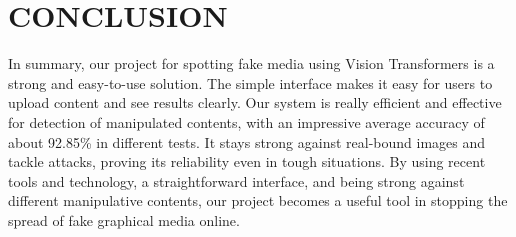 \section{CONCLUSION}
 In summary, our project for spotting fake media using Vision Transformers is a strong and easy-to-use solution. The simple interface makes it easy for users to upload content and see results clearly. Our system is really efficient and effective for detection of manipulated contents, with an impressive average accuracy of about 92.85\% in different tests. It stays strong against real-bound images and tackle attacks, proving its reliability even in tough situations. By using recent tools and technology, a straightforward interface, and being strong against different manipulative contents, our project becomes a useful tool in stopping the spread of fake graphical media online.